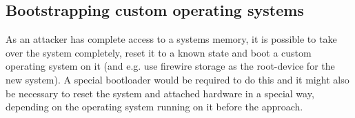\subsection{Bootstrapping custom operating systems}

As an attacker has complete access to a systems memory, it is possible to take
over the system completely, reset it to a known state and boot a custom
operating system on it (and e.g\@. use firewire storage as the root-device for
the new system). A special bootloader would be required to do this and it might
also be necessary to reset the system and attached hardware in a special way,
depending on the operating system running on it before the approach.

